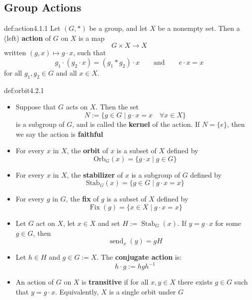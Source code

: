 \documentclass[landscape, 8pt]{extarticle}
\DeclareMathOperator{\Fix}{Fix}
\DeclareMathOperator{\Stab}{Stab}
\DeclareMathOperator{\send}{send}
\begin{document}
\begin{multicols}{3}
\subsection*{Group Actions}

\begin{dfn}{def:action}{4.1.1}
    Let $(G,*)$ be a group, and let $X$ be a nonempty set. Then a (left) \textbf{action} of $G$ on $X$ is a map
    \[G\times X\to X\]
    written $(g,x)\mapsto g\cdot x$, such that
    \[g_{1}\cdot(g_{2}\cdot x) = (g_{1} * g_{2}) \cdot x \qquad \text{and} \qquad e\cdot x = x \]
    for all $g_{1},g_{2}\in G$ and all $x\in X$.
\end{dfn}
\vspace{-5pt}

\begin{dfn}{def:orbit}{4.2.1}
    \renewcommand\labelitemi{\tiny$\bullet$}
    \begin{itemize}
        \setlength\itemsep{-2pt}
        \item Suppose that $G$ acts on $X$. Then the set
        \[N := \{g\in G\mid g\cdot x=x \quad\forall x\in X\}\]
        is a subgroup of $G$, and is called the \textbf{kernel} of the action. If $N = \{e\}$, then we say the action is \textbf{faithful}

        \item For every $x$ in $X$, the \textbf{orbit} of $x$ is a subset of $X$ defined by
        \[\text{Orb}_{G}(x)=\{g\cdot x \mid g\in G\}\]

        \item For every $x$ in $X$, the \textbf{stabilizer} of $x$ is a subgroup of $G$ defined by
        \[\text{Stab}_{G}(x)=\{g\in G \mid g\cdot x = x\}\]

        \item For every $g$ in $G$, the \textbf{fix} of $g$ is a subset of $X$ defined by
        \[\Fix (g) = \{x\in X\mid g\cdot x=x\}\]

        \item Let $G$ act on $X$, let $x\in X$ and set $H:=\Stab_{G}(x)$. If $y=g\cdot x$ for some $g\in G$, then
        \[\send_{x}(y)=gH\]

        \item Let $h\in H$ and $g\in G :=X$. The \textbf{conjugate action} is:
        \[h\cdot g := hgh^{-1}\]
        \item An action of $G$ on $X$ is \textbf{transitive} if for all $x,y\in X$ there exists $g\in G$ such that $y = g\cdot x$. Equivalently, $X$ is a single orbit under $G$


\end{itemize}
\end{dfn}
\end{multicols}
\end{document}
